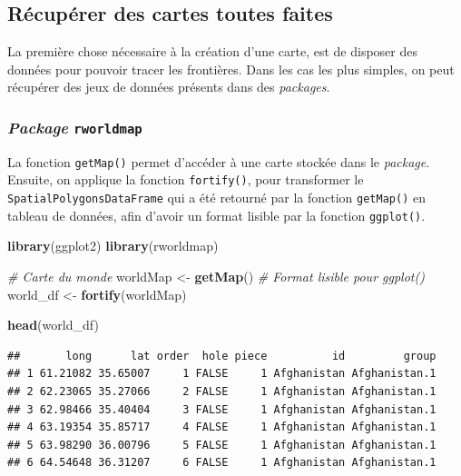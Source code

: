 \documentclass[
  11pt,
]{book}
\newenvironment{Shaded}{\begin{snugshade}}{\end{snugshade}}
\newcommand{\CommentTok}[1]{\textcolor[rgb]{0.56,0.35,0.01}{\textit{#1}}}
\newcommand{\KeywordTok}[1]{\textcolor[rgb]{0.13,0.29,0.53}{\textbf{#1}}}
\newcommand{\NormalTok}[1]{#1}
\newcommand{\StringTok}[1]{\textcolor[rgb]{0.31,0.60,0.02}{#1}}
\numberwithin{equation}{section}
\numberwithin{countremarque}{section}
\begin{document}
\hypertarget{graphiques_maps_recup}{%
\subsection{Récupérer des cartes toutes faites}\label{graphiques_maps_recup}}

La première chose nécessaire à la création d'une carte, est de disposer des données pour pouvoir tracer les frontières. Dans les cas les plus simples, on peut récupérer des jeux de données présents dans des \emph{packages}.

\hypertarget{graphiques_maps_recup_rworldmap}{%
\subsubsection{\texorpdfstring{\emph{Package} \texttt{rworldmap}}{Package rworldmap}}\label{graphiques_maps_recup_rworldmap}}

La fonction \texttt{getMap()} permet d'accéder à une carte stockée dans le \emph{package}. Ensuite, on applique la fonction \texttt{fortify()}, pour transformer le \texttt{SpatialPolygonsDataFrame} qui a été retourné par la fonction \texttt{getMap()} en tableau de données, afin d'avoir un format lisible par la fonction \texttt{ggplot()}.

\begin{Shaded}
\begin{Highlighting}[]
\KeywordTok{library}\NormalTok{(ggplot2)}
\KeywordTok{library}\NormalTok{(rworldmap)}

\CommentTok{\# Carte du monde}
\NormalTok{worldMap \textless{}{-}}\StringTok{ }\KeywordTok{getMap}\NormalTok{()}
\CommentTok{\# Format lisible pour ggplot()}
\NormalTok{world\_df \textless{}{-}}\StringTok{ }\KeywordTok{fortify}\NormalTok{(worldMap)}

\KeywordTok{head}\NormalTok{(world\_df)}
\end{Highlighting}
\end{Shaded}

\begin{lstlisting}
##       long      lat order  hole piece          id         group
## 1 61.21082 35.65007     1 FALSE     1 Afghanistan Afghanistan.1
## 2 62.23065 35.27066     2 FALSE     1 Afghanistan Afghanistan.1
## 3 62.98466 35.40404     3 FALSE     1 Afghanistan Afghanistan.1
## 4 63.19354 35.85717     4 FALSE     1 Afghanistan Afghanistan.1
## 5 63.98290 36.00796     5 FALSE     1 Afghanistan Afghanistan.1
## 6 64.54648 36.31207     6 FALSE     1 Afghanistan Afghanistan.1
\end{lstlisting}
\end{document}
